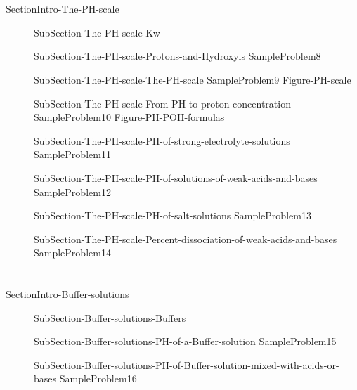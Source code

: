 \documentclass[main.tex]{subfiles}
\begin{document}
\section{\color{blue!30!black}{The PH scale}}{SectionIntro-The-PH-scale}
\sloppy
\begin{description}
\item[] {SubSection-The-PH-scale-Kw}
\item[] {SubSection-The-PH-scale-Protons-and-Hydroxyls}
  {SampleProblem8}
\item[] {SubSection-The-PH-scale-The-PH-scale}
  {SampleProblem9}
  {Figure-PH-scale}
\item[] {SubSection-The-PH-scale-From-PH-to-proton-concentration}
  {SampleProblem10}
  {Figure-PH-POH-formulas}
\item[] {SubSection-The-PH-scale-PH-of-strong-electrolyte-solutions}
  {SampleProblem11}
\item[] {SubSection-The-PH-scale-PH-of-solutions-of-weak-acids-and-bases}
  {SampleProblem12}
  
  
\item[] {SubSection-The-PH-scale-PH-of-salt-solutions}
  {SampleProblem13}
\item[] {SubSection-The-PH-scale-Percent-dissociation-of-weak-acids-and-bases}
  {SampleProblem14}
\end{description}
\section{\color{blue!30!black}{Buffer solutions}}{SectionIntro-Buffer-solutions}
\sloppy
\begin{description}
\item[] {SubSection-Buffer-solutions-Buffers}
\item[] {SubSection-Buffer-solutions-PH-of-a-Buffer-solution}
  {SampleProblem15}
\item[] {SubSection-Buffer-solutions-PH-of-Buffer-solution-mixed-with-acids-or-bases}
  {SampleProblem16}
\end{description}
\end{document}
